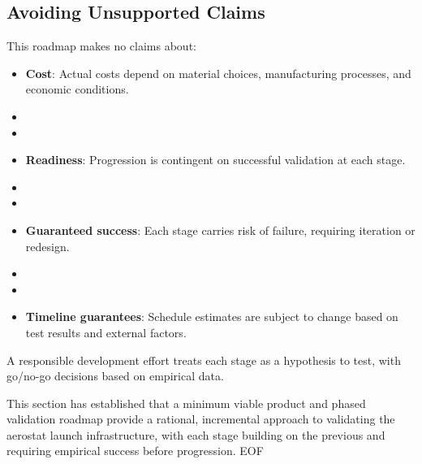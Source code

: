 \subsection{Avoiding Unsupported Claims}
This roadmap makes no claims about:
\begin{itemize}
    \item \textbf{Cost}: Actual costs depend on material choices, manufacturing processes, and economic conditions.
    \item \item \item \textbf{Readiness}: Progression is contingent on successful validation at each stage.
    \item \item \item \textbf{Guaranteed success}: Each stage carries risk of failure, requiring iteration or redesign.
    \item \item \item \textbf{Timeline guarantees}: Schedule estimates are subject to change based on test results and external factors.
\end{itemize}
A responsible development effort treats each stage as a hypothesis to test, with go/no-go decisions based on empirical data.

This section has established that a minimum viable product and phased validation roadmap provide a rational, incremental approach to validating the aerostat launch infrastructure, with each stage building on the previous and requiring empirical success before progression.
EOF